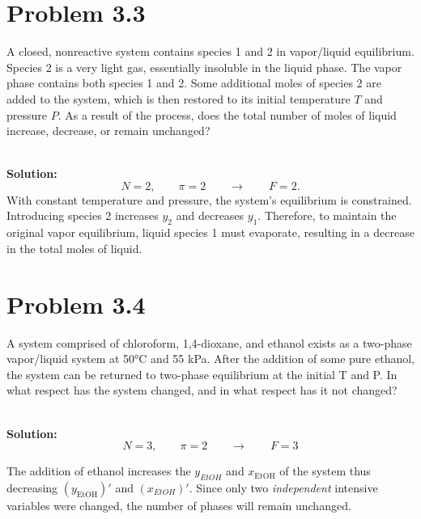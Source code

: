 \documentclass{article}
\newenvironment{solution}{\par\noindent\textbf{\\Solution:\\}}{\par\medskip}
\begin{document}
\section*{Problem 3.3}
A closed, nonreactive system contains species 1 and 2 in vapor/liquid equilibrium. Species 2 is a very light gas, essentially insoluble in the liquid phase. The vapor phase contains both species 1 and 2. Some additional moles of species 2 are added to the system, which is then restored to its initial temperature \( T \) and pressure \( P \). As a result of the process, does the total number of moles of liquid increase, decrease, or remain unchanged?

\begin{solution}
\begin{equation*}
      N=2, \qquad \pi=2 \qquad \to \qquad F=2.
\end{equation*}
With constant temperature and pressure, the system's equilibrium is constrained. Introducing species 2 increases $y_2$ and decreases $y_1$. Therefore, to maintain the original vapor equilibrium, liquid species 1 must evaporate, resulting in a decrease in the total moles of liquid.

\end{solution}

\section*{Problem 3.4}
A system comprised of chloroform, 1,4-dioxane, and ethanol exists as a two-phase vapor/liquid system at 50°C and 55 kPa. After the addition of some pure ethanol, the system can be returned to two-phase equilibrium at the initial T and P. In what respect has the system changed, and in what respect has it not changed?

\begin{solution}
\begin{equation*}
      N=3, \qquad \pi=2 \qquad \to \qquad F=3
\end{equation*}

The addition of ethanol increases the $y_{EtOH}$ and $x_{\text{EtOH}}$ of the system thus decreasing $\left( y_{\text{EtOH}} \right)'$ and $\left( x_{EtOH} \right)'$. Since only two \textit{independent} intensive variables were changed, the number of phases will remain unchanged. 
\end{solution}
\end{document}
